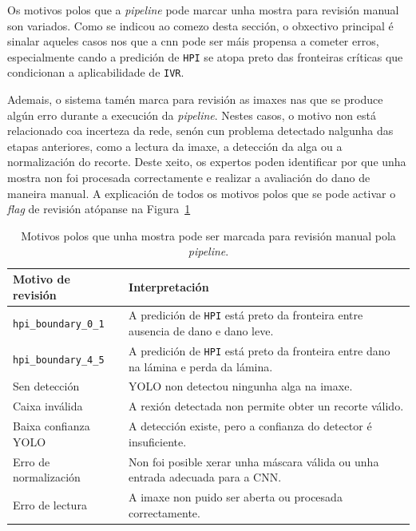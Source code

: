 Os motivos polos que a \textit{pipeline} pode marcar unha mostra para revisión manual son variados.
Como se indicou ao comezo desta sección, o obxectivo principal é sinalar aqueles casos nos que a
\gls{cnn} pode ser máis propensa a cometer erros, especialmente cando a predición de \texttt{HPI} se
atopa preto das fronteiras críticas que condicionan a aplicabilidade de \texttt{IVR}.

Ademais, o sistema tamén marca para revisión as imaxes nas que se produce algún erro durante a
execución da \textit{pipeline}. Nestes casos, o motivo non está relacionado coa incerteza da rede, senón
cun problema detectado nalgunha das etapas anteriores, como a lectura da imaxe, a detección da alga ou
a normalización do recorte. Deste xeito, os expertos poden identificar por que unha mostra non foi
procesada correctamente e realizar a avaliación do dano de maneira manual. A explicación de todos os 
motivos polos que se pode activar o \textit{flag} de revisión atópanse na Figura~\ref{tab:motivos-revision-pipeline}

\begin{table}[htbp]
    \centering
    \scriptsize
    \setlength{\tabcolsep}{3pt}
    \begin{tabular}{p{}|p{}}
        \rowcolor{udcpink!25}
        \textbf{Motivo de revisión} & \textbf{Interpretación} \\\hline
        \texttt{hpi\_boundary\_0\_1} & A predición de \texttt{HPI} está preto da fronteira entre ausencia de dano e dano leve. \\
        \texttt{hpi\_boundary\_4\_5} & A predición de \texttt{HPI} está preto da fronteira entre dano na lámina e perda da lámina. \\
        Sen detección & YOLO non detectou ningunha alga na imaxe. \\
        Caixa inválida & A rexión detectada non permite obter un recorte válido. \\
        Baixa confianza YOLO & A detección existe, pero a confianza do detector é insuficiente. \\
        Erro de normalización & Non foi posible xerar unha máscara válida ou unha entrada adecuada para a CNN. \\
        Erro de lectura & A imaxe non puido ser aberta ou procesada correctamente. \\
    \end{tabular}
    \caption{Motivos polos que unha mostra pode ser marcada para revisión manual pola \textit{pipeline}.}
    \label{tab:motivos-revision-pipeline}
\end{table}



